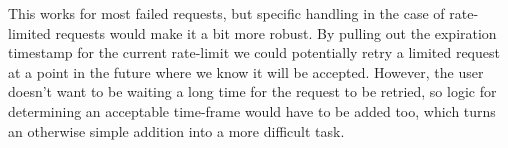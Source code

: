 This works for most failed requests, but specific handling in the case of rate-limited requests would make it a bit more robust. By pulling out the expiration timestamp for the current rate-limit we could potentially retry a limited request at a point in the future where we know it will be accepted. However, the user doesn't want to be waiting a long time for the request to be retried, so logic for determining an acceptable time-frame would have to be added too, which turns an otherwise simple addition into a more difficult task.
